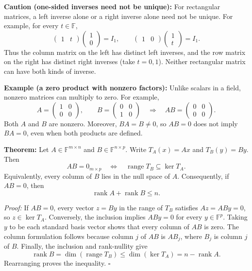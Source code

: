 \documentclass[a4paper,11pt,abstract=true]{scrartcl}
\theoremstyle{dotlessP}
\theoremstyle{dotlessS}
\theoremstyle{remark}
\theoremstyle{definition}
\begin{document}
\begin{remark_box}
\textbf{Caution (one-sided inverses need not be unique):}
For rectangular matrices, a left inverse alone or a right inverse alone
need not be unique. For example, for every $t\in\mathbb{F}$,
\[
\begin{pmatrix}1&t\end{pmatrix}\begin{pmatrix}1\\0\end{pmatrix}
=I_1,\qquad
\begin{pmatrix}1&0\end{pmatrix}\begin{pmatrix}1\\t\end{pmatrix}
=I_1.
\]
Thus the column matrix on the left has distinct left inverses, and
the row matrix on the right has distinct right inverses (take $t=0,1$).
Neither rectangular matrix can have both kinds of inverse.
\end{remark_box}

\begin{example_box}
\textbf{Example (a zero product with nonzero factors):} Unlike
scalars in a field, nonzero matrices can multiply to zero. For example,
\[
A=\begin{pmatrix}1&0\\0&0\end{pmatrix},\qquad
B=\begin{pmatrix}0&0\\1&0\end{pmatrix}
\quad\Longrightarrow\quad
AB=\begin{pmatrix}0&0\\0&0\end{pmatrix}.
\]
Both $A$ and $B$ are nonzero. Moreover, $BA=B\neq0$, so $AB=0$
does not imply $BA=0$, even when both products are defined.
\end{example_box}

\begin{claim_box}
\textbf{Theorem:} Let
$A\in\mathbb{F}^{m\times n}$ and $B\in\mathbb{F}^{n\times p}$.
Write $T_A(x)=Ax$ and $T_B(y)=By$. Then
\[
AB=0_{m\times p}
\quad\Longleftrightarrow\quad
\operatorname{range}T_B\subseteq\ker T_A.
\]
Equivalently, every column of $B$ lies in the null space of $A$.
Consequently, if $AB=0$, then
\[
\operatorname{rank}A+\operatorname{rank}B\leq n.
\]

\textit{Proof:} If $AB=0$, every vector $z=By$ in the range of $T_B$
satisfies $Az=ABy=0$, so $z\in\ker T_A$. Conversely, the inclusion
implies $ABy=0$ for every $y\in\mathbb{F}^p$. Taking $y$ to be each
standard basis vector shows that every column of $AB$ is zero.
The column formulation follows because column $j$ of $AB$ is $AB_j$,
where $B_j$ is column $j$ of $B$. Finally, the inclusion and
rank-nullity give
\[
\operatorname{rank}B=\dim(\operatorname{range}T_B)
\leq\dim(\ker T_A)=n-\operatorname{rank}A.
\]
Rearranging proves the inequality. \hfill$\square$
\end{claim_box}
\end{document}
